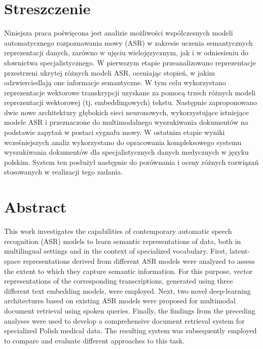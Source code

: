 \chapter*{Streszczenie}
Niniejsza praca poświęcona jest analizie możliwości współczesnych modeli automatycznego rozpoznawania mowy (ASR) w zakresie uczenia semantycznych reprezentacji danych, zarówno w ujęciu wielojęzycznym, jak i w odniesieniu do słownictwa specjalistycznego. W pierwszym etapie przeanalizowano reprezentacje przestrzeni ukrytej różnych modeli ASR, oceniając stopień, w jakim odzwierciedlają one informacje semantyczne. W tym celu wykorzystano reprezentacje wektorowe transkrypcji uzyskane za pomocą trzech różnych modeli reprezentacji wektorowej (tj. embeddingowych) tekstu. Następnie zaproponowano dwie nowe architektury głębokich sieci neuronowych, wykorzystujące istniejące modele ASR i przeznaczone do multimodalnego wyszukiwania dokumentów na podstawie zapytań w postaci sygnału mowy. W ostatnim etapie wyniki wcześniejszych analiz wykorzystano do opracowania kompleksowego systemu wyszukiwania dokumentów dla specjalistycznych danych medycznych w języku polskim. System ten posłużył następnie do porównania i oceny różnych rozwiązań stosowanych w realizacji tego zadania.
\chapter*{Abstract}
This work investigates the capabilities of contemporary automatic speech recognition (ASR) models to learn semantic representations of data, both in multilingual settings and in the context of specialized vocabulary. First, latent-space representations derived from different ASR models were analyzed to assess the extent to which they capture semantic information. For this purpose, vector representations of the corresponding transcriptions, generated using three different text embedding models, were employed. Next, two novel deep-learning architectures based on existing ASR models were proposed for multimodal document retrieval using spoken queries. Finally, the findings from the preceding analyses were used to develop a comprehensive document retrieval system for specialized Polish medical data. The resulting system was subsequently employed to compare and evaluate different approaches to this task.

